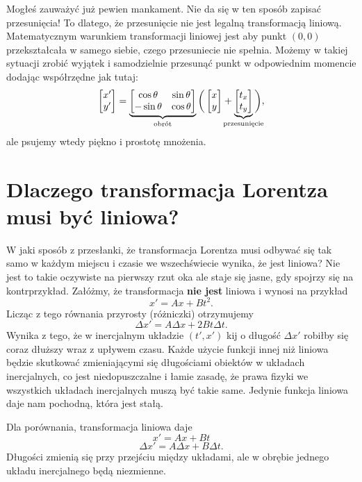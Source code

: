 \documentclass[10pt,twocolumn,fleqn,polish]{article}
\begin{document}
Mogłeś zauważyć już pewien mankament. Nie da się w ten sposób zapisać przesunięcia!
To dlatego, że przesunięcie nie jest legalną transformacją liniową. Matematycznym
warunkiem transformacji liniowej jest aby punkt $(0, 0)$ przekształcała
w samego siebie, czego przesuniecie nie spełnia.
Możemy w takiej sytuacji zrobić wyjątek i samodzielnie przesunąć punkt w odpowiednim
momencie dodając współrzędne jak tutaj:
\[
  \begin{bmatrix}x' \\ y'\end{bmatrix} =
  \underbrace{\begin{bmatrix}
      \cos \theta  & \sin \theta \\
      -\sin \theta & \cos \theta
    \end{bmatrix}}_{\text{obrót}}
  \bigg(
  \begin{bmatrix}x \\ y\end{bmatrix} + \mkern-20mu
  \underbrace{\begin{bmatrix}t_x \\ t_y\end{bmatrix}}_{\text{przesunięcie}}
  \mkern-20mu
  \bigg),
\]
ale psujemy wtedy piękno i prostotę mnożenia.

\newpage
\section*{Dlaczego transformacja Lorentza musi być liniowa?}
W jaki sposób z przesłanki, że transformacja Lorentza musi odbywać się tak samo w każdym miejscu
i czasie we wszechświecie wynika, że jest liniowa?
Nie jest to takie oczywiste na pierwszy rzut oka ale staje się jasne, gdy spojrzy się
na kontrprzykład.
Załóżmy, że transformacja \textbf{nie jest} liniowa i wynosi na przykład
\[x' = Ax + Bt^2.\]
Licząc z tego równania przyrosty (różniczki) otrzymujemy
\[\Delta x' = A \Delta x + 2Bt \Delta t.\]
Wynika z tego, że w inercjalnym układzie $(t', x')$ kij o długość $\Delta x'$ robiłby się
coraz dłuższy wraz z upływem czasu.
Każde użycie funkcji innej niż liniowa będzie skutkować zmieniającymi się długościami
obiektów w układach inercjalnych, co jest niedopuszczalne i łamie zasadę, że prawa fizyki
we wszystkich układach inercjalnych muszą być takie same.
Jedynie funkcja liniowa daje nam pochodną, która jest stałą.

Dla porównania, transformacja liniowa daje
\[x' = Ax + Bt\]
\[\Delta x' = A\Delta x + B\Delta t.\]
Długości zmienią się przy przejściu między układami, ale w obrębie jednego układu
inercjalnego będą niezmienne.
\end{document}
